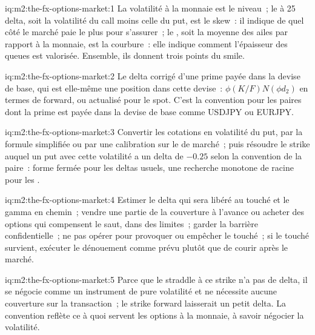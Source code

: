 \begin{solution}{iq:m2:the-fx-options-market:1}
La volatilité à la monnaie est le niveau~; le  à 25 delta, soit la volatilité du call
moins celle du put, est le skew~: il indique de quel côté le marché paie le plus pour s'assurer~; le
, soit la moyenne des ailes par rapport à la monnaie, est la courbure~: elle indique comment l'épaisseur des queues
est valorisée. Ensemble, ils donnent trois points du smile.
\end{solution}

\begin{solution}{iq:m2:the-fx-options-market:2}
Le delta corrigé d'une prime payée dans la devise de base, qui est elle-même une
position dans cette devise~: $\phi(K/F)N(\phi d_2)$ en termes de forward, ou actualisé
pour le spot. C'est la convention pour les paires dont la prime est payée dans la devise de base
comme USDJPY ou EURJPY.
\end{solution}

\begin{solution}{iq:m2:the-fx-options-market:3}
Convertir les cotations en volatilité du put, par la formule simplifiée ou par une
calibration sur le  de marché~; puis résoudre le strike auquel un put avec
cette volatilité a un delta de $-0.25$ selon la convention de la paire~: forme fermée pour
les deltas usuels, une recherche monotone de racine pour les .
\end{solution}

\begin{solution}{iq:m2:the-fx-options-market:4}
Estimer le delta qui sera libéré au touché et le gamma en chemin~;
vendre une partie de la couverture à l'avance ou acheter des options qui compensent le saut, dans des limites~;
garder la barrière confidentielle~; ne pas opérer pour provoquer ou empêcher le touché~; si
le touché survient, exécuter le dénouement comme prévu plutôt que de courir après le marché.
\end{solution}

\begin{solution}{iq:m2:the-fx-options-market:5}
Parce que le straddle à ce strike n'a pas de delta, il se négocie comme un instrument
de pure volatilité et ne nécessite aucune couverture sur la transaction~; le strike forward laisserait
un petit delta. La convention reflète ce à quoi servent les options à la monnaie,
à savoir négocier la volatilité.
\end{solution}


